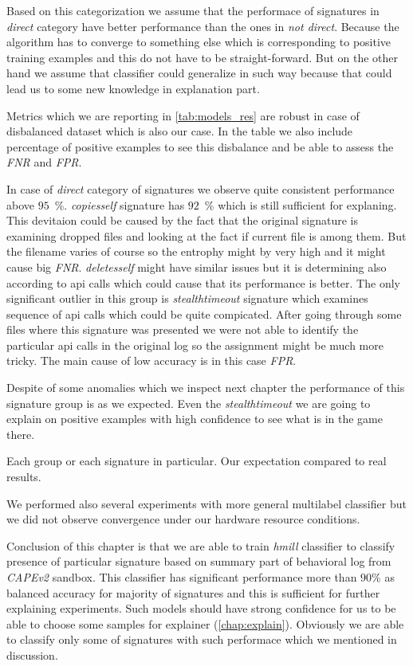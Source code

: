 Based on this categorization we assume that the performace of signatures in \emph{direct} category have better performance than the ones in \emph{not direct}. Because the algorithm has to converge to something else which is corresponding to positive training examples and this do not have to be straight-forward. But on the other hand we assume that classifier could generalize in such way because that could lead us to some new knowledge in explanation part.

Metrics which we are reporting in \ref{tab:models_res} are robust in case of disbalanced dataset which is also our case. In the table we also include percentage of positive examples to see this disbalance and be able to assess the \emph{FNR} and \emph{FPR}.

In case of \emph{direct} category of signatures we observe quite consistent performance above $95$~\%. \emph{copiesself} signature has $92$~\% which is still sufficient for explaning. This devitaion could be caused by the fact that the original signature is examining dropped files and looking at the fact if current file is among them. But the filename varies of course so the entrophy might by very high and it might cause big \emph{FNR}. \emph{deletesself} might have similar issues but it is determining also according to api calls which could cause that its performance is better. The only significant outlier in this group is \emph{stealthtimeout} signature which examines sequence of api calls which could be quite compicated. After going through some files where this signature was presented we were not able to identify the particular api calls in the original log so the assignment might be much more tricky. The main cause of low accuracy is in this case \emph{FPR}.

Despite of some anomalies which we inspect next chapter the performance of this signature group is as we expected. Even the \emph{stealthtimeout} we are going to explain on positive examples with high confidence to see what is in the game there.



Each group or each signature in particular. Our expectation compared to real results.


We performed also several experiments with more general multilabel classifier but we did not observe convergence under our hardware resource conditions.

Conclusion of this chapter is that we are able to train \emph{hmill} classifier to classify presence of particular signature based on summary part of behavioral log from \emph{CAPEv2} sandbox. This classifier has significant performance more than $90\%$ as balanced accuracy for majority of signatures and this is sufficient for further explaining experiments. Such models should have strong confidence for us to be able to choose some samples for explainer (\ref{chap:explain}). Obviously we are able to classify only some of signatures with such performace which we mentioned in discussion.

